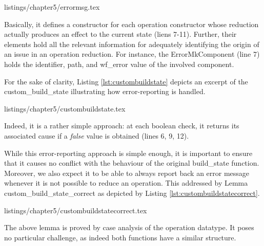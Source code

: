       
                          {listings/chapter5/errormsg.tex}			 				
                          
                          
	\noindent Basically, it defines a constructor for each \textsf{operation} constructor whose reduction
	actually produces an effect to the current \textsf{state} (liens 7-11). Further, their elements hold all the
	relevant information for adequately identifying the origin of an issue in an \textsf{operation} reduction.        
    For instance, the \textsf{ErrorMkComponent} (line 7) holds the identifier, \textsf{path}, 
    and \textsf{wf\_error} value of the involved \textsf{component}.          
                          
	For the sake of clarity, Listing \ref{lst:custombuildstate} depicts an excerpt of the
	\textsf{custom\_build\_state} illustrating how error-reporting is handled.                          
                          
                          
        
                          {listings/chapter5/custombuildstate.tex}			                   
                    
                    
	\noindent Indeed, it is a rather simple approach: at each boolean check, it returns its 
	associated cause if a \textit{false} value is obtained  (lines 6, 9, 12).                    
                    
                    
     While this error-reporting approach is simple enough, it is important to ensure that it causes no
     conflict with the behaviour of the original \textsf{build\_state} function. Moreover, we also expect it
     to be able to always report back an error message whenever it is not possible to
     reduce an \textsf{operation}. This addressed by Lemma \textsf{custom\_build\_state\_correct} 
     as depicted by Listing \ref{lst:custombuildstatecorrect}.                
                          
	 				
	
                      {listings/chapter5/custombuildstatecorrect.tex}			 				
	 				
	\noindent The above lemma is proved by case analysis of the \textsf{operation} datatype.
	It poses no particular challenge, as indeed both functions have a similar structure.	
	
